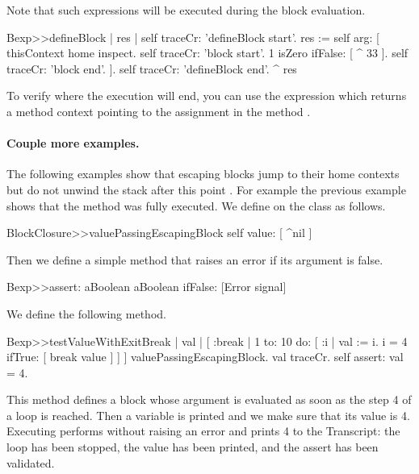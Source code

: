 \documentclass[a4paper,10pt,twoside]{book}
\begin{document}
Note that such expressions will be executed during the block evaluation.

\begin{code}{}
Bexp>>defineBlock
	| res |
	self traceCr: 'defineBlock start'.
	res := self arg: [ thisContext home inspect. 
					        self traceCr: 'block start'.
                            1 isZero ifFalse: [ ^ 33 ].
                            self traceCr: 'block end'. ].
	self traceCr: 'defineBlock end'.
	^ res
\end{code}

To verify where the execution will end, you can use the expression  which returns a method context pointing to the assignment in the method .

\paragraph{Couple more examples.}
The following examples show that escaping blocks jump to their home contexts but do not unwind the stack after this point . For example the previous example shows that the method  was fully executed.
We define  on the class  as follows.

\begin{code}{}
BlockClosure>>valuePassingEscapingBlock
	  self value: [ ^nil ]
\end{code}

Then we define a simple  method that raises an error if its argument is false.

\begin{code}{}
Bexp>>assert: aBoolean
	aBoolean ifFalse: [Error signal]
\end{code}

We define the following method.

\begin{code}{}
Bexp>>testValueWithExitBreak
	| val |
	[ :break |
	    1 to: 10 do: [ :i |
			         val := i.
			         i = 4 ifTrue: [ break value ] ] ] valuePassingEscapingBlock.
	val traceCr.
	self assert: val = 4.
\end{code}

This method defines a block whose argument  is evaluated as soon as the step 4 of a loop is reached. Then a variable  is printed and we make sure that its value is 4. Executing  performs without raising an error and prints 4 to the Transcript: the loop has been stopped, the value has been printed, and the assert has been validated.
\end{document}
